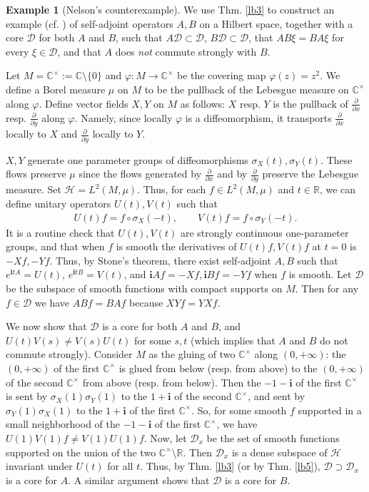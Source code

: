 \documentclass[12pt,a4paper,notitlepage]{article}
\theoremstyle{definition}
\newtheorem{eg}[df]{Example}
\theoremstyle{plain}
\newcommand{\mc}{\mathcal}
\newcommand{\Dom}{\scr D}
\newcommand{\scr}{\mathscr}
\newcommand{\im}{\mathbf{i}}
\newcommand{\Cbb}{\mathbb C}
\newcommand{\Rbb}{\mathbb R}
\numberwithin{equation}{subsection}
\begin{document}
	

\begin{eg}[Nelson's counterexample]
We use Thm. \ref{lb3} to construct an example (cf. \cite{Nel65}) of self-adjoint operators $A,B$ on a Hilbert space, together with a core $\Dom$ for both $A$ and $B$, such that $A\Dom\subset\Dom$, $B\Dom\subset \Dom$, that $AB\xi=BA\xi$ for every $\xi\in\Dom$, and that $A$ does \textit{not} commute strongly with $B$.

Let $M=\Cbb^\times:=\Cbb\setminus\{0\}$ and $\varphi:M\rightarrow\Cbb^\times$ be the covering map $\varphi(z)=z^2$. We define a Borel measure $\mu$ on $M$ to be the pullback of the Lebesgue measure on $\Cbb^\times$ along $\varphi$. Define vector fields $X,Y$ on $M$ as follows: $X$ resp. $Y$ is the pullback of $\frac\partial{\partial x}$ resp. $\frac\partial{\partial y}$ along $\varphi$. Namely, since locally $\varphi$ is a diffeomorphism, it transports  $\frac\partial{\partial x}$ locally to $X$ and $\frac\partial{\partial y}$ locally to $Y$.

$X,Y$ generate one parameter groups of diffeomorphisms $\sigma_X(t),\sigma_Y(t)$. These flows preserve $\mu$ since the flows generated by $\frac\partial{\partial x}$  and by $\frac\partial{\partial y}$ preserve the Lebesgue measure. Set $\mc H=L^2(M,\mu)$. Thus, for  each $f\in L^2(M,\mu)$ and $t\in\Rbb$, we can define unitary operators $U(t),V(t)$ such that
\begin{align*}
U(t)f	=f\circ\sigma_X(-t),\qquad V(t)f=f\circ \sigma_Y(-t).
\end{align*}
It is a routine check that $U(t),V(t)$ are strongly continuous one-parameter groups, and that when $f$ is smooth the derivatives of $U(t)f,V(t)f$ at $t=0$ is $-Xf,-Yf$. Thus, by Stone's theorem, there exist self-adjoint $A,B$ such that $e^{\im tA}=U(t)$, $e^{\im tB}=V(t)$, and $\im Af=-Xf,\im Bf=-Yf$ when $f$ is smooth. Let $\Dom$ be the subspace of smooth functions with compact supports on $M$. Then for any $f\in\Dom$ we have $ABf=BAf$ because $XYf=YXf$. 

We now show that $\Dom$ is a core for both $A$ and $B$, and $U(t)V(s)\neq V(s)U(t)$ for some $s,t$ (which implies that $A$ and $B$ do not commute strongly).  Consider $M$ as the gluing of two $\Cbb^\times$ along $(0,+\infty)$: the $(0,+\infty)$ of the first $\Cbb^\times$ is glued from below (resp. from above) to the $(0,+\infty)$ of the second $\Cbb^\times$ from above (resp. from below). Then the $-1-\im$ of the first $\Cbb^\times$ is sent by $\sigma_X(1)\sigma_Y(1)$ to the $1+\im$ of the second $\Cbb^\times$, and sent by $\sigma_Y(1)\sigma_X(1)$ to the $1+\im$ of the first $\Cbb^\times$. So, for some smooth $f$ supported in a small neighborhood of the $-1-\im$ of the first $\Cbb^\times$, we have $U(1)V(1)f\neq V(1)U(1)f$. Now, let $\Dom_x$ be the set of smooth functions supported on the union of the two $\Cbb^\times\setminus \Rbb$. Then $\Dom_x$ is a dense subspace of $\mc H$ invariant under $U(t)$ for all $t$. Thus, by Thm. \ref{lb3} (or by Thm. \ref{lb5}), $\Dom\supset\Dom_x$ is a core for $A$. A similar argument shows that $\Dom$ is a core for $B$.
\end{eg}
\end{document}
